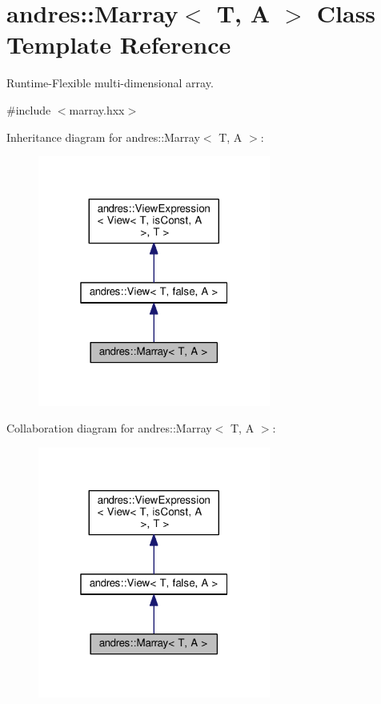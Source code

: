 \hypertarget{classandres_1_1Marray}{}\section{andres\+:\+:Marray$<$ T, A $>$ Class Template Reference}
\label{classandres_1_1Marray}


Runtime-\/\+Flexible multi-\/dimensional array.  




{\ttfamily \#include $<$marray.\+hxx$>$}



Inheritance diagram for andres\+:\+:Marray$<$ T, A $>$\+:\nopagebreak
\begin{figure}[H]
\begin{center}
\leavevmode
\includegraphics[width=217pt]{classandres_1_1Marray__inherit__graph}
\end{center}
\end{figure}


Collaboration diagram for andres\+:\+:Marray$<$ T, A $>$\+:\nopagebreak
\begin{figure}[H]
\begin{center}
\leavevmode
\includegraphics[width=217pt]{classandres_1_1Marray__coll__graph}
\end{center}
\end{figure}
